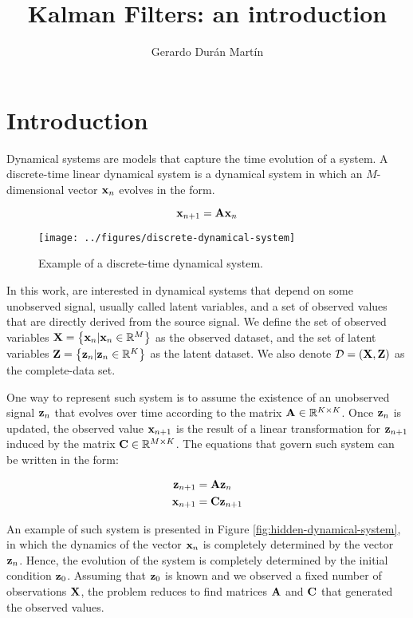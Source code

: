 \documentclass[11pt]{article}
\title{Kalman Filters: an introduction}
\author{Gerardo Durán Martín}
\begin{document}
\maketitle

\section{Introduction}
Dynamical systems are models that capture the time evolution of a system. A discrete-time linear dynamical system is a dynamical system in which an $M$-dimensional vector ${\bf x}_n$ evolves in the form.

\begin{equation}
	{\bf x}_{n+1} = {\bf A x}_n
\end{equation}

\begin{figure}[h!]
	\centering
	\texttt{[image: ../figures/discrete-dynamical-system]}
	\caption{Example of a discrete-time dynamical system.}
	\label{fig:discrete-dynamical-system}
\end{figure}



In this work, are interested in dynamical systems that depend on some unobserved signal, usually called latent variables, and a set of observed values that are directly derived from the source signal. We define the set of observed variables ${\bf X}=\left\{{\bf x}_n \vert {\bf x}_n \in \mathbb{R}^M\right\}$ as the observed dataset, and the set of latent variables ${\bf Z}=\left\{{\bf z}_n \vert {\bf z}_n \in \mathbb{R}^K\right\}$ as the latent dataset. We also denote $\mathcal{D} = ({\bf X}, {\bf Z})$ as the complete-data set.

One way to represent such system is to assume the existence of an unobserved signal ${\bf z}_n$ that evolves over time according to the matrix ${\bf A}\in\mathbb{R}^{K\times K}$. Once ${\bf z}_{n}$ is updated, the observed value ${\bf x}_{n+1}$ is the result of a linear transformation for ${\bf z}_{n+1}$ induced by the matrix ${\bf C}\in \mathbb{R}^{M\times K}$. The equations that govern such system can be written in the form:

\begin{align*}
	{\bf z}_{n+1} &= {\bf A} {\bf z}_{n}\\
	{\bf x}_{n+1} &= {\bf C} {\bf z}_{n+1}
\end{align*}

An example of such system is presented in Figure \ref{fig:hidden-dynamical-system}, in which the dynamics of the vector ${\bf x}_n$ is completely determined by the vector ${\bf z}_n$. Hence, the evolution of the system is completely determined by the initial condition ${\bf z}_0$. Assuming that ${\bf z}_0$ is known and we observed a fixed number of observations ${\bf X}$, the problem reduces to find matrices ${\bf A}$ and ${\bf C}$ that generated the observed values.
\end{document}
